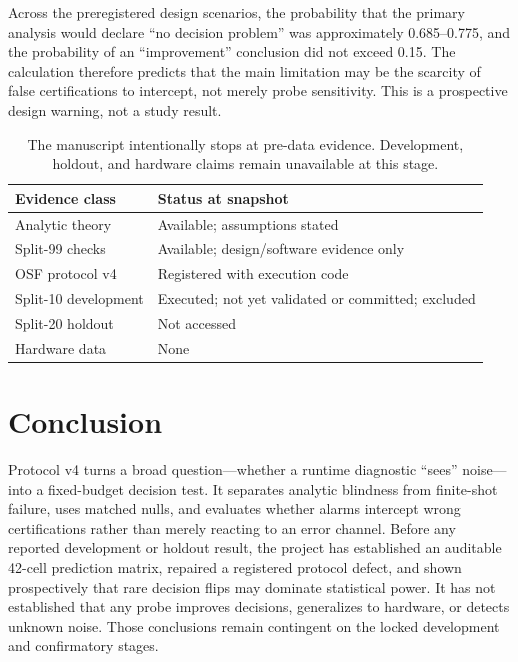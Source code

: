 \documentclass[10pt,twocolumn]{article}
\begin{document}
Across the preregistered design scenarios, the probability that the primary
analysis would declare ``no decision problem'' was approximately 0.685--0.775,
and the probability of an ``improvement'' conclusion did not exceed 0.15. The
calculation therefore predicts that the main limitation may be the scarcity of
false certifications to intercept, not merely probe sensitivity. This is a
prospective design warning, not a study result.

\begin{table}[t]
\centering
\caption{The manuscript intentionally stops at pre-data evidence. Development,
holdout, and hardware claims remain unavailable at this stage.}
\label{tab:status}
\begin{tabularx}{\columnwidth}{@{}p{}X@{}}
\toprule
Evidence class & Status at snapshot \\
\midrule
Analytic theory & Available; assumptions stated \\
Split-99 checks & Available; design/software evidence only \\
OSF protocol v4 & Registered with execution code \\
Split-10 development & Executed; not yet validated or committed; excluded \\
Split-20 holdout & Not accessed \\
Hardware data & None \\
\bottomrule
\end{tabularx}
\end{table}

\section{Conclusion}

Protocol v4 turns a broad question---whether a runtime diagnostic ``sees''
noise---into a fixed-budget decision test. It separates analytic blindness from
finite-shot failure, uses matched nulls, and evaluates whether alarms intercept
wrong certifications rather than merely reacting to an error channel. Before
any reported development or holdout result, the project has established an
auditable 42-cell prediction matrix, repaired a registered protocol defect,
and shown prospectively that rare decision flips may dominate statistical
power. It has not established that any probe improves decisions, generalizes to
hardware, or detects unknown noise. Those conclusions remain contingent on the
locked development and confirmatory stages.
\end{document}
